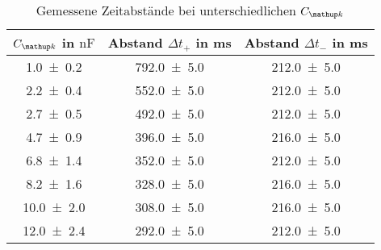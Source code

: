 \begin{table} 
\centering 
\caption{Gemessene Zeitabstände bei unterschiedlichen $C\ua{k}$} 
\label{tab:teilc_gemessene_zeit} 
\begin{tabular}{S S S } 
\toprule  
{$C\ua{k}$ in $\si{\nano\farad}$} & {Abstand $\Delta t_+$ in \si{\milli\second}} & {Abstand $\Delta t_-$ in \si{\milli\second}}  \\ 
\midrule  
 \num{1.0\pm0.2} & \num{792.0\pm5.0} & \num{212.0\pm5.0}\\ 
\num{2.2\pm0.4} & \num{552.0\pm5.0} & \num{212.0\pm5.0}\\ 
\num{2.7\pm0.5} & \num{492.0\pm5.0} & \num{212.0\pm5.0}\\ 
\num{4.7\pm0.9} & \num{396.0\pm5.0} & \num{216.0\pm5.0}\\ 
\num{6.8\pm1.4} & \num{352.0\pm5.0} & \num{212.0\pm5.0}\\ 
\num{8.2\pm1.6} & \num{328.0\pm5.0} & \num{216.0\pm5.0}\\ 
\num{10.0\pm2.0} & \num{308.0\pm5.0} & \num{216.0\pm5.0}\\ 
\num{12.0\pm2.4} & \num{292.0\pm5.0} & \num{212.0\pm5.0}\\ 
\bottomrule 
\end{tabular} 
\end{table}

